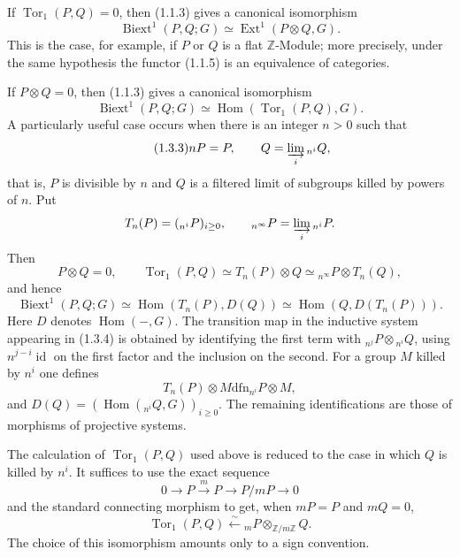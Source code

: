 \documentclass[11pt]{article}
\providecommand{\liminj}{\varinjlim}
\providecommand{\Hom}{\operatorname{Hom}}
\providecommand{\Ext}{\operatorname{Ext}}
\providecommand{\id}{\operatorname{id}}
\providecommand{\Biext}{\operatorname{Biext}}
\providecommand{\Ext}{\operatorname{Ext}}
\providecommand{\Torop}{\operatorname{Tor}}
\providecommand{\dfn}{\mathrel{\mathrm{dfn}}}
\begin{document}
If \(\Torop_1(P,Q)=0\), then (1.1.3) gives a canonical isomorphism
\begin{equation}\tag{1.2.2}
        \Biext^1(P,Q;G)\simeq \Ext^1(P\otimes Q,G).
\end{equation}
This is the case, for example, if \(P\) or \(Q\) is a flat \(\mathbb Z\)-Module; more precisely, under the same hypothesis the functor (1.1.5) is an equivalence of categories.

If \(P\otimes Q=0\), then (1.1.3) gives a canonical isomorphism
\begin{equation}\tag{1.3.2}
        \Biext^1(P,Q;G)\simeq \Hom(\Torop_1(P,Q),G).
\end{equation}
A particularly useful case occurs when there is an integer \(n>0\) such that
\begin{equation}\tag{1.3.3}
        nP=P,
        \qquad
        Q=\liminj_i {}_{n^i}Q,
\end{equation}
that is, \(P\) is divisible by \(n\) and \(Q\) is a filtered limit of subgroups killed by powers of \(n\).  Put
\[
        T_n(P)=({}_{n^i}P)_{i\ge0},
        \qquad
        {}_{n^\infty}P=\liminj_i {}_{n^i}P.
\]
Then
\begin{equation}\tag{1.3.4}
        P\otimes Q=0,
        \qquad
        \Torop_1(P,Q)\simeq T_n(P)\otimes Q
        \simeq {}_{n^\infty}P\otimes T_n(Q),
\end{equation}
and hence
\begin{equation}\tag{1.3.5}
        \Biext^1(P,Q;G)
        \simeq \Hom(T_n(P),D(Q))
        \simeq \Hom(Q,D(T_n(P))).
\end{equation}
Here \(D\) denotes \(\Hom(-,G)\).  The transition map in the inductive system appearing in (1.3.4) is obtained by identifying the first term with \({}_{n^j}P\otimes{}_{n^i}Q\), using \(n^{j-i}\id\) on the first factor and the inclusion on the second.  For a group \(M\) killed by \(n^i\) one defines
\[
        T_n(P)\otimes M\dfn {}_{n^i}P\otimes M,
\]
and \(D(Q)=(\Hom({}_{n^i}Q,G))_{i\ge0}\).  The remaining identifications are those of morphisms of projective systems.

The calculation of \(\Torop_1(P,Q)\) used above is reduced to the case in which \(Q\) is killed by \(n^i\).  It suffices to use the exact sequence
\[
        0\to P\xrightarrow{m}P\to P/mP\to0
\]
and the standard connecting morphism to get, when \(mP=P\) and \(mQ=0\),
\begin{equation}\tag{1.3.6}
        \Torop_1(P,Q)\xleftarrow{\sim}{}_mP\otimes_{\mathbb Z/m\mathbb Z} Q.
\end{equation}
The choice of this isomorphism amounts only to a sign convention.
\end{document}
